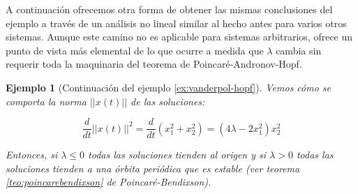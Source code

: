 \documentclass[11pt]{book}
\theoremstyle{definition}
\numberwithin{definition}{section}
\theoremstyle{theorem}
\numberwithin{theorem}{section}
\numberwithin{lemma}{section}
\numberwithin{corollary}{section}
\theoremstyle{plain}
\newtheorem{example}{Ejemplo}
\numberwithin{example}{section}
\begin{document}
A continuación ofrecemos otra forma de obtener las mismas conclusiones del ejemplo a través de un análisis no lineal similar al hecho antes para varios otros sistemas. Aunque este camino no es aplicable para sistemas arbitrarios, ofrece un punto de vista más elemental de lo que ocurre a medida que $\lambda$ cambia sin requerir toda la maquinaria del teorema de Poincaré-Andronov-Hopf.

\begin{example}[Continuación del ejemplo \ref{ex:vanderpol-hopf}]
Vemos cómo se comporta la norma $||x(t)||$ de las soluciones:

$$
	\dfrac{d}{dt} ||x(t)||^2 = \dfrac{d}{dt}(x_1^2 + x_2^2) = (4\lambda - 2x_1^2)x_2^2
$$

Entonces, si $\lambda \leq 0$ todas las soluciones tienden al origen y si $\lambda > 0$ todas las soluciones tienden a una órbita periódica que es estable (ver teorema \ref{teo:poincarebendixson} de Poincaré-Bendixson).

\end{example}
\end{document}
